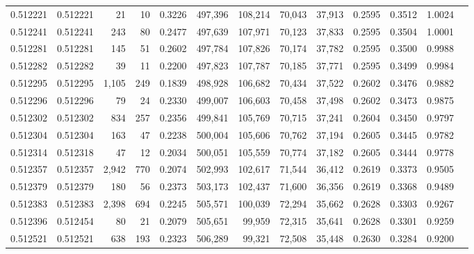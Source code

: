 \begin{tabular}{rrrrrrrrrrrrr}
0.512221 & 0.512221 &    21 &    10 &                                     0.3226 & 497,396 & 108,214 &  70,043 &  37,913 & 0.2595 & 0.3512 & 1.0024 \\
0.512241 & 0.512241 &   243 &    80 &                                     0.2477 & 497,639 & 107,971 &  70,123 &  37,833 & 0.2595 & 0.3504 & 1.0001 \\
0.512281 & 0.512281 &   145 &    51 &                                     0.2602 & 497,784 & 107,826 &  70,174 &  37,782 & 0.2595 & 0.3500 & 0.9988 \\
0.512282 & 0.512282 &    39 &    11 &                                     0.2200 & 497,823 & 107,787 &  70,185 &  37,771 & 0.2595 & 0.3499 & 0.9984 \\
0.512295 & 0.512295 & 1,105 &   249 &                                     0.1839 & 498,928 & 106,682 &  70,434 &  37,522 & 0.2602 & 0.3476 & 0.9882 \\
0.512296 & 0.512296 &    79 &    24 &                                     0.2330 & 499,007 & 106,603 &  70,458 &  37,498 & 0.2602 & 0.3473 & 0.9875 \\
0.512302 & 0.512302 &   834 &   257 &                                     0.2356 & 499,841 & 105,769 &  70,715 &  37,241 & 0.2604 & 0.3450 & 0.9797 \\
0.512304 & 0.512304 &   163 &    47 &                                     0.2238 & 500,004 & 105,606 &  70,762 &  37,194 & 0.2605 & 0.3445 & 0.9782 \\
0.512314 & 0.512318 &    47 &    12 &                                     0.2034 & 500,051 & 105,559 &  70,774 &  37,182 & 0.2605 & 0.3444 & 0.9778 \\
0.512357 & 0.512357 & 2,942 &   770 &                                     0.2074 & 502,993 & 102,617 &  71,544 &  36,412 & 0.2619 & 0.3373 & 0.9505 \\
0.512379 & 0.512379 &   180 &    56 &                                     0.2373 & 503,173 & 102,437 &  71,600 &  36,356 & 0.2619 & 0.3368 & 0.9489 \\
0.512383 & 0.512383 & 2,398 &   694 &                                     0.2245 & 505,571 & 100,039 &  72,294 &  35,662 & 0.2628 & 0.3303 & 0.9267 \\
0.512396 & 0.512454 &    80 &    21 &                                     0.2079 & 505,651 &  99,959 &  72,315 &  35,641 & 0.2628 & 0.3301 & 0.9259 \\
0.512521 & 0.512521 &   638 &   193 &                                     0.2323 & 506,289 &  99,321 &  72,508 &  35,448 & 0.2630 & 0.3284 & 0.9200 \\

\end{tabular}
